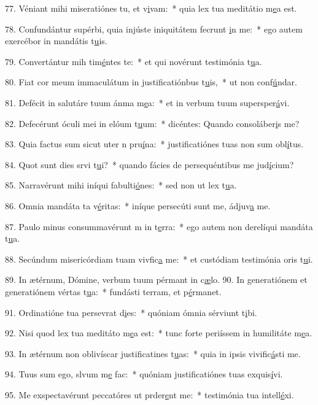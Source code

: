 77. Véniant mihi miseratiónes tu, et v\uline{i}vam:~* quia lex tua meditátio m\uline{e}a est.\par 
78. Confundántur supérbi, quia injúste iniquitátem fecrunt \uline{i}n me:~* ego autem exercébor in mandátis t\uline{u}is.\par 
79. Convertántur mih tim\uline{é}ntes te:~* et qui novérunt testimónia t\uline{u}a.\par 
80. Fiat cor meum immaculátum in justificatiónbus t\uline{u}is,~* ut non conf\uline{ú}ndar.\par 
81. Defécit in salutáre tuum ánma m\uline{e}a:~* et in verbum tuum supersper\uline{á}vi.\par 
82. Defecérunt óculi mei in elóum t\uline{u}um:~* dicéntes: Quando consoláber\uline{i}s me?\par 
83. Quia factus sum sicut uter n pru\uline{í}na:~* justificatiónes tuas non sum obl\uline{í}tus.\par 
84. Quot sunt dies srvi t\uline{u}i?~* quando fácies de persequéntibus me jud\uline{í}cium?\par 
85. Narravérunt mihi iníqui fabulti\uline{ó}nes:~* sed non ut lex t\uline{u}a.\par 
86. Omnia mandáta ta v\uline{é}ritas:~* iníque persecúti sunt me, ádjuv\uline{a} me.\par 
87. Paulo minus consummavérunt m in t\uline{e}rra:~* ego autem non derelíqui mandáta t\uline{u}a.\par 
88. Secúndum misericórdiam tuam vivfic\uline{a} me:~* et custódiam testimónia oris t\uline{u}i.\par 
89. In ætérnum, Dómine, verbum tuum pérmant in c\uline{æ}lo.
90. In generatiónem et generatiónem vértas t\uline{u}a:~* fundásti terram, et p\uline{é}rmanet.\par 
91. Ordinatióne tua persevrat d\uline{i}es:~* quóniam ómnia sérviunt t\uline{i}bi.\par 
92. Nisi quod lex tua meditáto m\uline{e}a est:~* tunc forte periíssem in humilitáte m\uline{e}a.\par 
93. In ætérnum non oblivíscar justificatines t\uline{u}as:~* quia in ipsis vivific\uline{á}sti me.\par 
94. Tuus sum ego, slvum m\uline{e} fac:~* quóniam justificatiónes tuas exquis\uline{í}vi.\par 
95. Me exspectavérunt peccatóres ut prder\uline{e}nt me:~* testimónia tua intell\uline{é}xi.\par 
